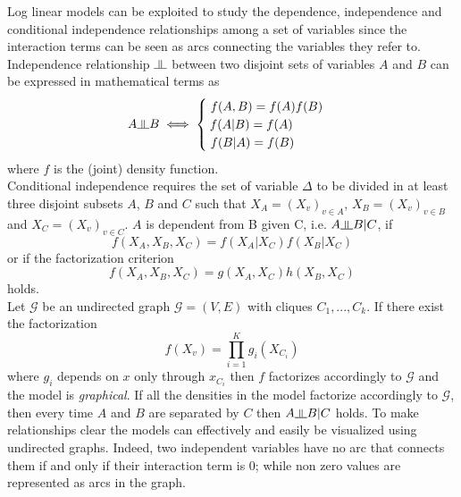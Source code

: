 \documentclass{article}
\newcommand{\indep}{\rotatebox[origin=c]{90}{$\models$}}
\begin{document}
Log linear models can be exploited to study the dependence, independence and conditional independence relationships among a set of variables since the interaction terms can be seen as arcs connecting the variables they refer to. \\
Independence relationship $\indep$  between two disjoint sets of variables $A$ and $B$ can be expressed in mathematical terms as 
\begin{equation}
    A \indep B  \iff
        \begin{cases}
        \; f(A,B)=f(A)f(B) \\
        \: f(A|B) = f(A) \\
        \; f(B|A) = f(B)\\
        \end{cases}
\end{equation}
where $f$ is the (joint) density function. \\

Conditional independence requires the set of variable $\Delta$ to be divided in at least three disjoint subsets $A$, $B$ and $C$ such that
$X_A=(X_v)_{v \in A}$, $X_B=(X_v)_{ v \in B}$ and $X_C=(X_v)_{ v \in C}$.
$A$ is dependent from B given C, i.e. $A \indep B | C$, if 
\begin{equation}
    f(X_A,X_B,X_C) = f(X_A|X_C)f(X_B|X_C)
\end{equation}
or if the factorization criterion
\begin{equation}
    f(X_A,X_B,X_C) = g(X_A,X_C)h(X_B,X_C)
\end{equation} holds. \\

Let $\mathcal{G}$ be an undirected graph $\mathcal{G} = (V,E) $ with cliques $C_1,...,C_k$. If  there exist the factorization
\begin{equation}
    f(X_v) =  \prod\limits_{i=1}^{K}g_i(X_{C_i})
\end{equation} where $g_i$ depends on $x$ only through $x_{C_i}$ then $f$ factorizes accordingly to $\mathcal{G}$ and the model is \textit{graphical}.
If all the densities in the model factorize accordingly to $\mathcal{G}$, then every time $A$ and $B$ are separated by $C$ then $A \indep B | C$ holds.
To make relationships clear the models can effectively and easily be visualized using undirected graphs. Indeed, two independent variables have no arc that connects them if and only if their interaction term is 0; while non zero values are represented as arcs in the graph. \\
\end{document}
